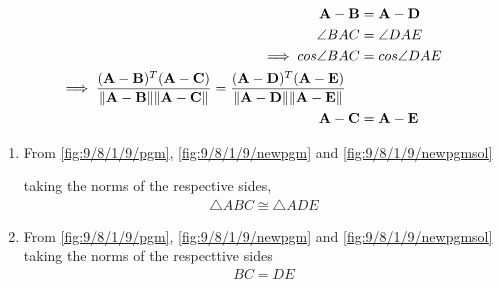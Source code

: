 \documentclass[10pt,a4paper]{article}
\let\vec\mathbf
\begin{document}
\begin{align}
\vec{A}-\vec{B}&=\vec{A}-\vec{D}
\label{fig:9/8/1/9/pgm}\\
\angle BAC &=\angle DAE\\
\implies cos \angle BAC &=cos \angle DAE\\
\begin{split}
\implies \frac{(\vec{A}-\vec{B})^T(\vec{A}-\vec{C})}{\norm{\vec{A}-\vec{B}}\norm{\vec{A}-\vec{C}}} &=
\frac{(\vec{A}-\vec{D})^T(\vec{A}-\vec{E})}{\norm{\vec{A}-\vec{D}}\norm{\vec{A}-\vec{E}}}
\end{split}
\label{fig:9/8/1/9/newpgm}\\
\vec{A}-\vec{C}&=\vec{A}-\vec{E}
\label{fig:9/8/1/9/newpgmsol}
\end{align}

	
\begin{enumerate}
    \item From 
		\eqref{fig:9/8/1/9/pgm}, 
		\eqref{fig:9/8/1/9/newpgm}
		and 
		\eqref{fig:9/8/1/9/newpgmsol}
		
		taking the norms of the respective sides, 
    \begin{align}
        \triangle ABC \cong \triangle ADE
    \end{align}
    
\item From  
		\eqref{fig:9/8/1/9/pgm}, 
		\eqref{fig:9/8/1/9/newpgm}
		and 
		\eqref{fig:9/8/1/9/newpgmsol}
 taking the norms of the respecttive sides
 \begin{align}
BC=DE
 \end{align}    
\end{enumerate}
\end{document}

